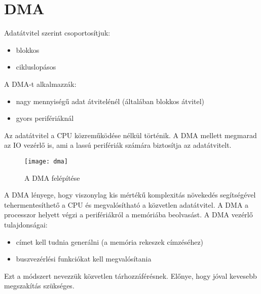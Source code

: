 \section{DMA}
Adatátvitel szerint csoportosítjuk:
\begin{itemize}
    \item blokkos
    \item cikluslopásos
\end{itemize}

A DMA-t alkalmazzák:
\begin{itemize}
    \item nagy mennyiségű adat átvitelénél (általában blokkos átvitel)
    \item gyors perifériáknál
\end{itemize}
Az adatátvitel a CPU közreműködése nélkül történik.
A DMA mellett megmarad az IO vezérlő is, ami a lassú perifériák számára biztosítja az adatátvitelt.
\begin{figure}[H]
    \texttt{[image: dma]}
    \centering
    \caption{A DMA felépítése}
    \label{fig:dma}
\end{figure}
A DMA lényege, hogy viszonylag kis mértékű komplexitás növekedés segítségével tehermentesíthető a CPU és megvalósítható a közvetlen adatátvitel.
A DMA a processzor helyett végzi a perifériákról a memóriába beolvasást.
A DMA vezérlő tulajdonságai:
\begin{itemize}
    \item címet kell tudnia generálni (a memória rekeszek címzéséhez)
    \item buszvezérlési funkciókat kell megvalósítania
\end{itemize}
Ezt a módszert nevezzük közvetlen tárhozzáférésnek.
Előnye, hogy jóval kevesebb megszakítás szükséges.

